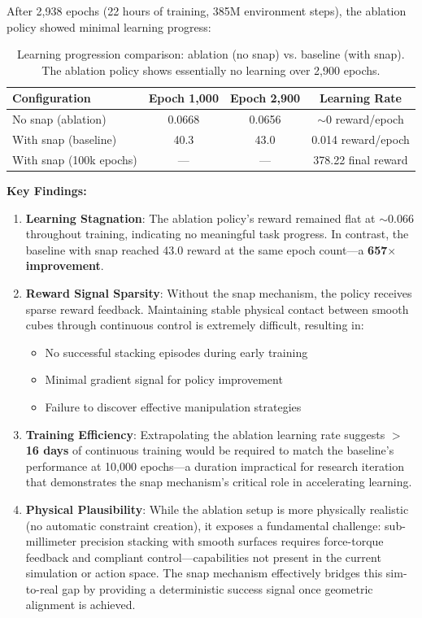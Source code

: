\documentclass[12pt,a4paper,oneside]{report}
\begin{document}
After 2{,}938 epochs (22 hours of training, 385M environment steps), the ablation policy showed minimal learning progress:

\begin{table}[h]
\centering
\begin{tabular}{|l|c|c|c|}
\hline
\textbf{Configuration} & \textbf{Epoch 1{,}000} & \textbf{Epoch 2{,}900} & \textbf{Learning Rate} \\
\hline
No snap (ablation) & 0.0668 & 0.0656 & $\sim$0 reward/epoch \\
With snap (baseline) & 40.3 & 43.0 & 0.014 reward/epoch \\
With snap (100k epochs) & --- & --- & 378.22 final reward \\
\hline
\end{tabular}
\caption{Learning progression comparison: ablation (no snap) vs. baseline (with snap). The ablation policy shows essentially no learning over 2{,}900 epochs.}
\label{tab:ablation_no_snap}
\end{table}

\textbf{Key Findings:}

\begin{enumerate}
    \item \textbf{Learning Stagnation}: The ablation policy's reward remained flat at $\sim$0.066 throughout training, indicating no meaningful task progress. In contrast, the baseline with snap reached 43.0 reward at the same epoch count---a \textbf{657$\times$ improvement}.

    \item \textbf{Reward Signal Sparsity}: Without the snap mechanism, the policy receives sparse reward feedback. Maintaining stable physical contact between smooth cubes through continuous control is extremely difficult, resulting in:
    \begin{itemize}
        \item No successful stacking episodes during early training
        \item Minimal gradient signal for policy improvement
        \item Failure to discover effective manipulation strategies
    \end{itemize}

    \item \textbf{Training Efficiency}: Extrapolating the ablation learning rate suggests \textbf{$>$16 days} of continuous training would be required to match the baseline's performance at 10{,}000 epochs---a duration impractical for research iteration that demonstrates the snap mechanism's critical role in accelerating learning.

    \item \textbf{Physical Plausibility}: While the ablation setup is more physically realistic (no automatic constraint creation), it exposes a fundamental challenge: sub-millimeter precision stacking with smooth surfaces requires force-torque feedback and compliant control---capabilities not present in the current simulation or action space. The snap mechanism effectively bridges this sim-to-real gap by providing a deterministic success signal once geometric alignment is achieved.
\end{enumerate}
\end{document}
